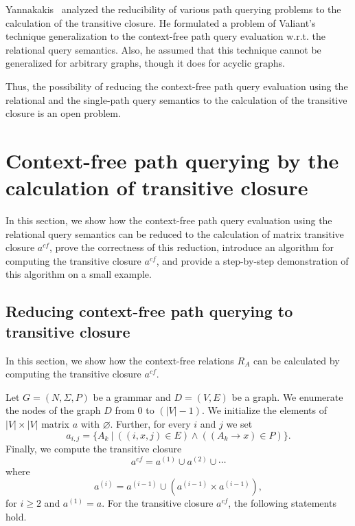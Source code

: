\documentclass[runningheads,a4paper]{llncs}
\begin{document}
Yannakakis~\cite{transitive-closure} analyzed the reducibility of various path querying problems to the calculation of the transitive closure. He formulated a problem of Valiant's technique generalization to the context-free path query evaluation w.r.t. the relational query semantics. Also, he assumed that this technique cannot be generalized for arbitrary graphs, though it does for acyclic graphs.

Thus, the possibility of reducing the context-free path query evaluation using the relational and the single-path query semantics to the calculation of the transitive closure is an open problem.

\section{Context-free path querying by the calculation of transitive closure}%
In this section, we show how the context-free path query evaluation using the relational query semantics can be reduced to the calculation of matrix transitive closure $a^{cf}$, prove the correctness of this reduction, introduce an algorithm for computing the transitive closure $a^{cf}$, and provide a step-by-step demonstration of this algorithm on a small example.

\subsection{Reducing context-free path querying to transitive closure} \label{section_reducing}
In this section, we show how the context-free relations $R_A$ can be calculated by computing the transitive closure $a^{cf}$.

Let $G = (N,\Sigma,P)$ be a grammar and $D = (V, E)$ be a graph. We enumerate the nodes of the graph $D$ from 0 to $(|V| - 1)$. We initialize the elements of $|V| \times |V|$ matrix $a$ with $\varnothing$. Further, for every $i$ and $j$ we set $$a_{i,j} = \{A_k~|~((i,x,j) \in E) \wedge ((A_k \rightarrow x) \in P)\}.$$ Finally, we compute the transitive closure $$a^{cf} = a^{(1)} \cup a^{(2)} \cup \cdots$$ where $$a^{(i)} = a^{(i-1)} \cup (a^{(i-1)} \times a^{(i-1)}),$$ for $i \ge 2$ and $a^{(1)} = a$. For the transitive closure $a^{cf}$, the following statements hold.
\end{document}
